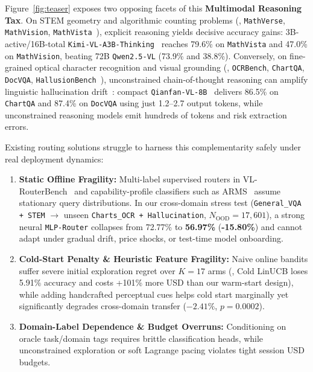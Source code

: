 \documentclass[10pt,twocolumn,letterpaper]{article}
\begin{document}
Figure~\ref{fig:teaser} exposes two opposing facets of this \textbf{Multimodal Reasoning Tax}. On STEM geometry and algorithmic counting problems (\eg, \texttt{MathVerse}, \texttt{MathVision}, \texttt{MathVista}~\citep{lu2024mathvista,zhang2024mathverse}), explicit reasoning yields decisive accuracy gains: 3B-active/16B-total \texttt{Kimi-VL-A3B-Thinking}~\citep{kimi2025kimivl} reaches 79.6\% on \texttt{MathVista} and 47.0\% on \texttt{MathVision}, beating 72B \texttt{Qwen2.5-VL} (73.9\% and 38.8\%). Conversely, on fine-grained optical character recognition and visual grounding (\eg, \texttt{OCRBench}, \texttt{ChartQA}, \texttt{DocVQA}, \texttt{HallusionBench}~\citep{liu2024ocrbench,masry2022chartqa,mathew2021docvqa,guan2024hallusionbench}), unconstrained chain-of-thought reasoning can amplify linguistic hallucination drift~\citep{shoby2026overthinking}: compact \texttt{Qianfan-VL-8B}~\citep{dong2025qianfanvl} delivers 86.5\% on \texttt{ChartQA} and 87.4\% on \texttt{DocVQA} using just 1.2--2.7 output tokens, while unconstrained reasoning models emit hundreds of tokens and risk extraction errors.

Existing routing solutions struggle to harness this complementarity safely under real deployment dynamics:
\begin{enumerate}
    \item \textbf{Static Offline Fragility:} Multi-label supervised routers in VL-RouterBench~\citep{huang2025vlrouterbench} and capability-profile classifiers such as ARMS~\citep{wang2026arms} assume stationary query distributions. In our cross-domain stress test (\texttt{General\_VQA + STEM} $\to$ unseen \texttt{Charts\_OCR + Hallucination}, $N_{\text{OOD}}{=}17{,}601$), a strong neural \texttt{MLP-Router} collapses from 72.77\% to \textbf{56.97\%} (\textbf{-15.80\%}) and cannot adapt under gradual drift, price shocks, or test-time model onboarding.
    \item \textbf{Cold-Start Penalty \& Heuristic Feature Fragility:} Naive online bandits suffer severe initial exploration regret over $K{=}17$ arms (\eg, Cold LinUCB loses 5.91\% accuracy and costs +101\% more USD than our warm-start design), while adding handcrafted perceptual cues helps cold start marginally yet significantly degrades cross-domain transfer ($-2.41\%$, $p{=}0.0002$).
    \item \textbf{Domain-Label Dependence \& Budget Overruns:} Conditioning on oracle task/domain tags requires brittle classification heads, while unconstrained exploration or soft Lagrange pacing violates tight session USD budgets.
\end{enumerate}
\end{document}
